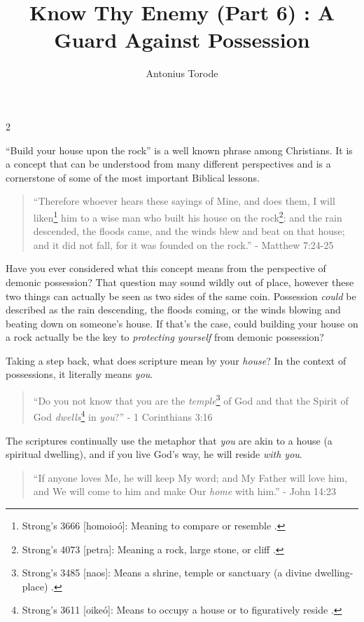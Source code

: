 \documentclass[10pt]{article}
\title{Know Thy Enemy (Part 6) 	: A Guard Against Possession}
\author{Antonius Torode}
\begin{document}
\maketitle
\thispagestyle{fancy}



\begin{multicols}{2}

``Build your house upon the rock'' is a well known phrase among Christians. It is a concept that can be understood from many different perspectives and is a cornerstone of some of the most important Biblical lessons.
\begin{quotation}
``Therefore whoever hears these sayings of Mine, and does them, I will liken\footnote{Strong's 3666 [homoioó]: Meaning to compare or resemble \cite{Bible Hub}.} him to a wise man who built his house on the rock\footnote{Strong's 4073 [petra]: Meaning a rock, large stone, or cliff \cite{Bible Hub}.}: and the rain descended, the floods came, and the winds blew and beat on that house; and it did not fall, for it was founded on the rock.'' - Matthew 7:24-25
\end{quotation}
Have you ever considered what this concept means from the perspective of demonic possession? That question may sound wildly out of place, however these two things can actually be seen as two sides of the same coin. Possession \textit{could} be described as the rain descending, the floods coming, or the winds blowing and beating down on someone's house. If that's the case, could building your house on a rock actually be the key to \textit{protecting yourself} from demonic possession?

Taking a step back, what does scripture mean by your \textit{house}? In the context of possessions, it literally means \textit{you}.
\begin{quotation}
``Do you not know that you are the \textit{temple}\footnote{Strong's 3485 [naos]: Means a shrine, temple or sanctuary (a divine dwelling-place) \cite{Bible Hub}.} of God and that the Spirit of God \textit{dwells}\footnote{Strong's 3611 [oikeó]: Means to occupy a house or to figuratively reside \cite{Bible Hub}.} in \textit{you}?'' - 1 Corinthians 3:16
\end{quotation}
The scriptures continually use the metaphor that \textit{you} are akin to a house (a spiritual dwelling), and if you live God's way, he will reside \textit{with you}.
\begin{quotation}
``If anyone loves Me, he will keep My word; and My Father will love him, and We will come to him and make Our \textit{home} with him.'' - John 14:23
\end{quotation}


\end{multicols}
\end{document}
